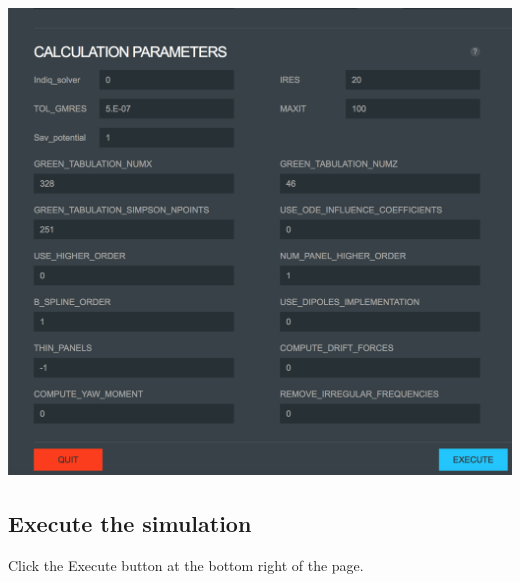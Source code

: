 \documentclass[12pt]{article}
\begin{document}
\vspace{\abovedisplayskip}
\begin{minipage}{\linewidth}
	\centering
	\includegraphics[scale=0.4]{img/28}
\end{minipage}
\vspace{\belowdisplayskip}

\subsection{ Execute the simulation}
Click the Execute button at the bottom right of the page.
\end{document}
